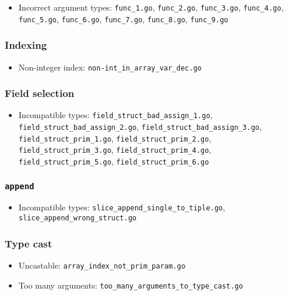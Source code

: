 \documentclass{article}
\begin{document}
\begin{itemize}
\item Incorrect argument types: \texttt{func\_1.go}, \texttt{func\_2.go}, \texttt{func\_3.go}, \texttt{func\_4.go}, \texttt{func\_5.go}, \texttt{func\_6.go}, \texttt{func\_7.go}, \texttt{func\_8.go}, \texttt{func\_9.go}
\end{itemize}

\subsubsection{Indexing}

\begin{itemize}
\item Non-integer index: \texttt{non-int\_in\_array\_var\_dec.go}

\end{itemize}

\subsubsection{Field selection}

\begin{itemize}
\item Incompatible types: \texttt{field\_struct\_bad\_assign\_1.go}, \texttt{field\_struct\_bad\_assign\_2.go}, \texttt{field\_struct\_bad\_assign\_3.go}, \texttt{field\_struct\_prim\_1.go}, \texttt{field\_struct\_prim\_2.go}, \texttt{field\_struct\_prim\_3.go}, \texttt{field\_struct\_prim\_4.go}, \texttt{field\_struct\_prim\_5.go}, \texttt{field\_struct\_prim\_6.go}
\end{itemize}

\subsubsection{\texttt{append}}

\begin{itemize}
\item Incompatible types: \texttt{slice\_append\_single\_to\_tiple.go}, \texttt{slice\_append\_wrong\_struct.go}
\end{itemize}

\subsubsection{Type cast}

\begin{itemize}
\item Uncastable: \texttt{array\_index\_not\_prim\_param.go}
\item Too many arguments: \texttt{too\_many\_arguments\_to\_type\_cast.go}
\end{itemize}
\end{document}
